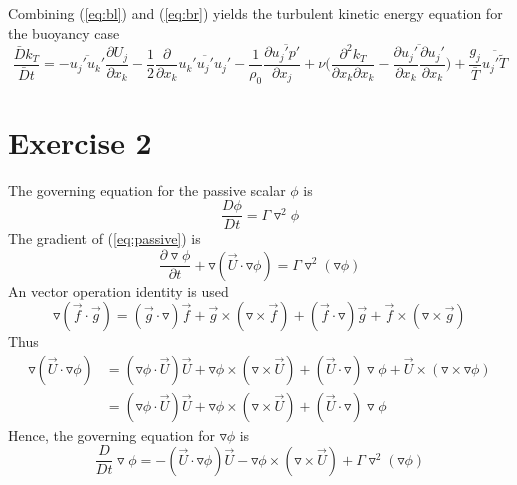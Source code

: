 \documentclass[paper=a4, fontsize=11pt]{scrartcl} %
\numberwithin{equation}{section} %
\numberwithin{figure}{section} %
\numberwithin{table}{section} %
\begin{document}
 	Combining (\ref{eq:bl}) and (\ref{eq:br}) yields the turbulent kinetic energy equation for the buoyancy case
 	\begin{equation}
 		\frac{\bar{D}k_T}{\bar{D}t} = -\overline{u_j' u_k'}\frac{\partial U_j}{\partial x_k} - \frac{1}{2}\frac{\partial}{\partial x_k}\overline{u_k' u_j' u_j'} -\frac{1}{\rho_0} \frac{\partial \overline{u_j' p'}}{\partial x_j} + \nu \Big(\frac{\partial^2 k_T}{\partial x_k \partial x_k} - \overline{\frac{\partial u_j'}{\partial x_k} \frac{\partial u_j'}{\partial x_k}}\Big) + \frac{g_j}{\bar{T}}\overline{u_j' \tilde{T}}
 	\end{equation}
 	\newpage
 
\section{Exercise 2}
	The governing equation for the passive scalar $\phi$ is
	\begin{equation}\label{eq:passive}
		\frac{D \phi}{D t} = \Gamma \triangledown^2 \phi
	\end{equation}
	The gradient of (\ref{eq:passive}) is
	\begin{equation}
		\frac{\partial \triangledown \phi}{\partial t} + \triangledown(\vec{U}\cdot\triangledown\phi) = \Gamma \triangledown^2(\triangledown\phi)
	\end{equation}
	An vector operation identity is used
	\begin{equation}
		\triangledown(\vec{f}\cdot\vec{g}) = (\vec{g}\cdot\triangledown)\vec{f} + \vec{g} \times (\triangledown \times \vec{f}) + (\vec{f} \cdot \triangledown)\vec{g} + \vec{f} \times (\triangledown \times \vec{g})
	\end{equation}
	Thus
	\begin{equation}
		\begin{aligned}
			\triangledown(\vec{U} \cdot \triangledown\phi) 
			& = (\triangledown\phi \cdot \vec{U})\vec{U} + \triangledown\phi \times (\triangledown \times \vec{U}) + (\vec{U} \cdot \triangledown) \triangledown \phi + \vec{U} \times (\triangledown \times \triangledown\phi)\\
			& = (\triangledown\phi \cdot \vec{U})\vec{U} + \triangledown\phi \times (\triangledown \times \vec{U}) + (\vec{U} \cdot \triangledown) \triangledown \phi
		\end{aligned}
	\end{equation}
	Hence, the governing equation for $\triangledown\phi$ is
	\begin{equation}\label{eq:gp}
		\frac{D}{Dt}\triangledown\phi = -(\vec{U} \cdot \triangledown\phi)\vec{U} - \triangledown\phi \times (\triangledown \times \vec{U}) + \Gamma \triangledown^2(\triangledown\phi)  
	\end{equation}
\end{document}
